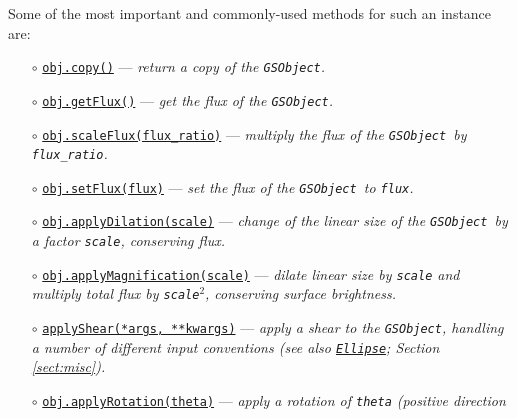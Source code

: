 \documentclass[preprint,11pt]{aastex}
\begin{document}
Some of the most important and commonly-used methods for such an
instance are:
\begin{itemize}
\item[$\circ$]
  \href{http://galsim-developers.github.com/GalSim/classgalsim_1_1base_1_1_g_s_object.html#aa0b398d4b0fca70211e4a73f81ea7e1a}{\texttt{obj.copy()}}
  --- \emph{return a copy of the \texttt{GSObject}.}
\item[$\circ$]
  \href{http://galsim-developers.github.com/GalSim/classgalsim_1_1base_1_1_g_s_object.html#a662d8ce421ecd90080bdcaaf6890aed8}{\texttt{obj.getFlux()}}
  --- \emph{get the flux of the \texttt{GSObject}.}
\item[$\circ$]\href{http://galsim-developers.github.com/GalSim/classgalsim_1_1base_1_1_g_s_object.html#af4193645a9af52e7d54a044cafec8ab9}{\texttt{obj.scaleFlux(flux\_ratio)}}
  --- \emph{multiply the flux of the \texttt{GSObject}~by \texttt{flux\_ratio}.}
\item[$\circ$]
  \href{http://galsim-developers.github.com/GalSim/classgalsim_1_1base_1_1_g_s_object.html#a1993652591ddc802b734186391b28894}{\texttt{obj.setFlux(flux)}}
    --- \emph{set the flux of the \texttt{GSObject}~to \texttt{flux}.}
\item[$\circ$]
  \href{http://galsim-developers.github.com/GalSim/classgalsim_1_1base_1_1_g_s_object.html#a4301c73bbc1491ebb170e64c509cadd5}{\texttt{obj.applyDilation(scale)}}
  --- \emph{change of the linear size of the \texttt{GSObject}~by a
    factor \texttt{scale}, conserving flux.}
\item[$\circ$]
  \href{http://galsim-developers.github.com/GalSim/classgalsim_1_1base_1_1_g_s_object.html#a9d13b0238057f6d5d01f2681d91c09b0}{\texttt{obj.applyMagnification(scale)}}
  --- \emph{dilate linear size by \texttt{scale} and multiply total flux by
  \texttt{scale}$^2$, conserving surface brightness.}
\item[$\circ$]
  \href{http://galsim-developers.github.com/GalSim/classgalsim_1_1base_1_1_g_s_object.html#a85cc0094dcf470cfbff93d9830ab80bd}{\texttt{applyShear(*args,
      **kwargs)}}
  --- \emph{apply a shear to the \texttt{GSObject}, handling a number of different
  input conventions (see also
  \href{http://galsim-developers.github.com/GalSim/classgalsim_1_1ellipse_1_1_ellipse.html}{\texttt{Ellipse}};
  Section \ref{sect:misc}).}
\item[$\circ$]
  \href{http://galsim-developers.github.com/GalSim/classgalsim_1_1base_1_1_g_s_object.html#ad6236e3153f23f1201396369dd67f1c7}{\texttt{obj.applyRotation(theta)}}
  --- \emph{apply a rotation of \texttt{theta} (positive direction
}
\end{itemize}
\end{document}

